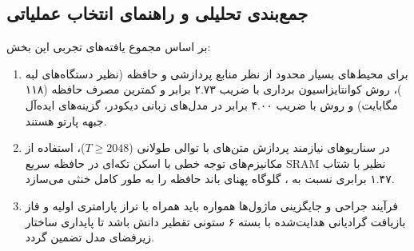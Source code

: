\subsection{جمع‌بندی تحلیلی و راهنمای انتخاب عملیاتی}
بر اساس مجموع یافته‌های تجربی این بخش:
\begin{enumerate}
    \item برای محیط‌های بسیار محدود از نظر منابع پردازشی و حافظه (نظیر دستگاه‌های لبه )، روش کوانتایزاسیون برداری  با ضریب ۲.۷۳ برابر و کمترین مصرف حافظه (۱۱۸ مگابایت) و روش  با ضریب ۴.۰۰ برابر در مدل‌های زبانی دیکودر، گزینه‌های ایده‌آل جبهه پارتو هستند.
    \item در سناریوهای نیازمند پردازش متن‌های با توالی طولانی ($T \ge 2048$)، استفاده از مکانیزم‌های توجه خطی با اسکن تکه‌ای در حافظه سریع SRAM نظیر  با شتاب ۱.۴۷ برابری نسبت به ، گلوگاه پهنای باند حافظه را به طور کامل خنثی می‌سازد.
    \item فرآیند جراحی و جایگزینی ماژول‌ها همواره باید همراه با تراز پارامتری اولیه و فاز بازیافت گرادیانی هدایت‌شده با بسته ۶ ستونی تقطیر دانش باشد تا پایداری ساختار زیرفضای مدل تضمین گردد.
\end{enumerate}
